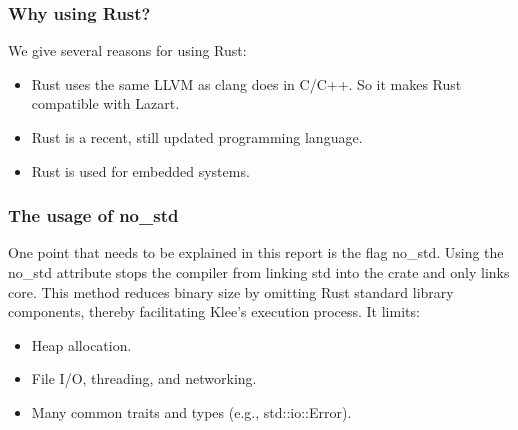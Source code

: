 \subsubsection{Why using Rust?}
We give several reasons for using Rust: 
\begin{itemize}
    \item Rust uses the same LLVM as clang does in C/C++. So it makes Rust compatible with Lazart.
    \item Rust is a recent, still updated programming language.
    \item Rust is used for embedded systems.
\end{itemize}

\subsubsection{The usage of no\_std}
One point that needs to be explained in this report is the flag no\_std.
Using the no\_std attribute stops the compiler from linking std into the crate and only links core. This method reduces binary size by omitting Rust standard library components, thereby facilitating Klee's execution process.
It limits:
\begin{itemize}
    \item Heap allocation.
    \item File I/O, threading, and networking.
    \item Many common traits and types (e.g., std::io::Error).
\end{itemize}